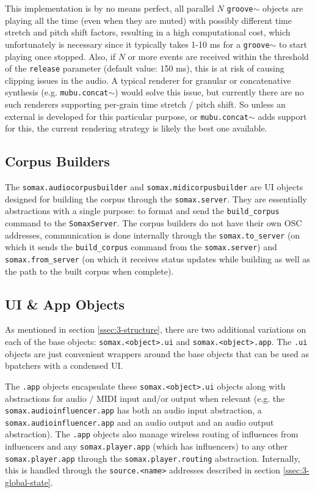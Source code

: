 This implementation is by no means perfect, all parallel $N$ \texttt{groove$\sim$} objects are playing all the time (even when they are muted) with possibly different time stretch and pitch shift factors, resulting in a high computational cost, which unfortunately is necessary since it typically takes 1-10 ms for a \texttt{groove$\sim$} to start playing once stopped. Also, if $N$ or more events are received within the threshold of the \texttt{release} parameter (default value: 150 ms), this is at risk of causing clipping issues in the audio. A typical renderer for granular or concatenative synthesis (e.g. \texttt{mubu.concat$\sim$}) would solve this issue, but currently there are no such renderers supporting per-grain time stretch / pitch shift. So unless an external is developed for this particular purpose, or \texttt{mubu.concat$\sim$} adds support for this, the current rendering strategy is likely the best one available.



\subsection{Corpus Builders}\label{ssec:3-corpusbuilders}
The \texttt{somax.audiocorpusbuilder} and \texttt{somax.midicorpusbuilder} are UI objects designed for building the corpus through the \texttt{somax.server}. They are essentially abstractions with a single purpose: to format and send the \texttt{build\_corpus} command to the \texttt{SomaxServer}. The corpus builders do not have their own OSC addresses, communication is done internally through the \texttt{somax.to\_server} (on which it sends the \texttt{build\_corpus} command from the \texttt{somax.server}) and \texttt{somax.from\_server} (on which it receives status updates while building as well as the path to the built corpus when complete). 



\subsection{UI \& App Objects}\label{ssec:3-app-objects}
As mentioned in section \ref{ssec:3-structure}, there are two additional variations on each of the base objects: \texttt{somax.<object>.ui} and \texttt{somax.<object>.app}. The \texttt{.ui} objects are just convenient wrappers around the base objects that can be used as bpatchers with a condensed UI.

The \texttt{.app} objects encapsulate these \texttt{somax.<object>.ui} objects along with abstractions for audio / MIDI input and/or output when relevant (e.g. the \texttt{somax.audioinfluencer.app} has both an audio input abstraction, a \texttt{somax.audioinfluencer.app} and an audio output and an audio output abstraction). The \texttt{.app} objects also manage wireless routing of influences from influencers and any \texttt{somax.player.app} (which has influencers) to any other \texttt{somax.player.app} through the \texttt{somax.player.routing} abstraction. Internally, this is handled through the \texttt{source.<name>} addresses described in section \ref{ssec:3-global-state}.

